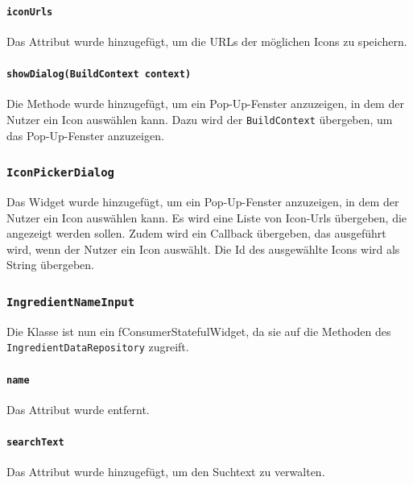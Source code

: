 \documentclass{implementierungsheft}
\begin{document}
\paragraph{\texttt{iconUrls}} Das Attribut wurde hinzugefügt, um die URLs der möglichen Icons zu speichern.
\paragraph{\texttt{showDialog(BuildContext context)}} Die Methode wurde hinzugefügt, um ein Pop-Up-Fenster anzuzeigen, in dem der Nutzer ein Icon auswählen kann. Dazu wird der \texttt{BuildContext} übergeben, um das Pop-Up-Fenster anzuzeigen.
\subsubsection*{\texttt{IconPickerDialog}}
Das Widget wurde hinzugefügt, um ein Pop-Up-Fenster anzuzeigen, in dem der Nutzer ein Icon auswählen kann. Es wird eine Liste von Icon-Urls übergeben, die angezeigt werden sollen. Zudem wird ein Callback übergeben, das ausgeführt wird, wenn der Nutzer ein Icon auswählt. Die Id des ausgewählte Icons wird als String übergeben.
\subsubsection*{\texttt{IngredientNameInput}}
Die Klasse ist nun ein fConsumerStatefulWidget, da sie auf die Methoden des \texttt{IngredientDataRe\-pository} zugreift.
\paragraph{\texttt{name}} Das Attribut wurde entfernt.
\paragraph{\texttt{searchText}} Das Attribut wurde hinzugefügt, um den Suchtext zu verwalten.
\end{document}
